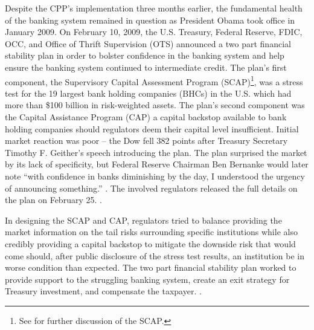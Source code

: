 \documentclass[12pt]{article}
\begin{document}
Despite the CPP's implementation three months earlier, the fundamental health of the banking system remained in question as President Obama took office in January 2009. On February 10, 2009, the U.S. Treasury, Federal Reserve, FDIC, OCC, and Office of Thrift Supervision (OTS) announced a two part financial stability plan in order to bolster confidence in the banking system and help ensure the banking system continued to intermediate credit. The plan's first component, the Supervisory Capital Assessment Program (SCAP)\footnote{See \citet{Ross2016b} for further discussion of the SCAP.}, was a stress test for the 19 largest bank holding companies (BHCs) in the U.S. which had more than \$100 billion in risk-weighted assets. The plan's second component was the Capital Assistance Program (CAP) a capital backstop available to bank holding companies should regulators deem their capital level insufficient. Initial market reaction was poor -- the Dow fell 382 points after Treasury Secretary Timothy F. Geither's speech introducing the plan. The plan surprised the market by its lack of specificity, but Federal Reserve Chairman Ben Bernanke would later note “with confidence in banks diminishing by the day, I understood the urgency of announcing something.'' \citep{Bernanke}. The involved regulators released the full details on the plan on February 25. \citep{CAPTerms}.


In designing the SCAP and CAP, regulators tried to balance providing the market information on the tail risks surrounding specific institutions while also credibly providing a capital backstop to mitigate the downside risk that would come should, after public disclosure of the stress test results, an institution be in worse condition than expected. The two part financial stability plan worked to provide support to the struggling banking system, create an exit strategy for Treasury investment, and compensate the taxpayer. \citep{GW}.
\end{document}
